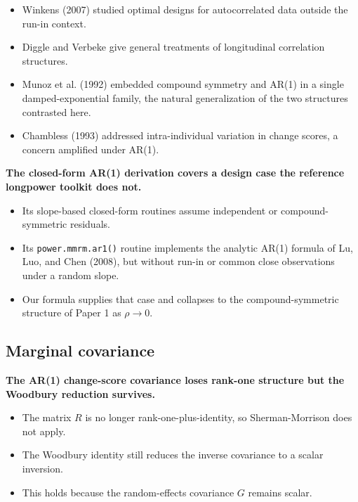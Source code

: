 \documentclass[
  11pt,
]{article}
\begin{document}
\begin{itemize}\setlength{\itemsep}{2pt}\setlength{\parskip}{0pt}
\item Winkens (2007) studied optimal designs for autocorrelated data outside the run-in context.
\item Diggle and Verbeke give general treatments of longitudinal correlation structures.
\item Munoz et al. (1992) embedded compound symmetry and AR(1) in a single damped-exponential family, the natural generalization of the two structures contrasted here.
\item Chambless (1993) addressed intra-individual variation in change scores, a concern amplified under AR(1).
\end{itemize}

\textbf{The closed-form AR(1) derivation covers a design case the reference longpower toolkit does not.}

\begin{itemize}\setlength{\itemsep}{2pt}\setlength{\parskip}{0pt}
\item Its slope-based closed-form routines assume independent or compound-symmetric residuals.
\item Its \texttt{power.mmrm.ar1()} routine implements the analytic AR(1) formula of Lu, Luo, and Chen (2008), but without run-in or common close observations under a random slope.
\item Our formula supplies that case and collapses to the compound-symmetric structure of Paper 1 as $\rho \to 0$.
\end{itemize}

\subsection{Marginal covariance}\label{marginal-covariance}

\textbf{The AR(1) change-score covariance loses rank-one structure but the Woodbury reduction survives.}

\begin{itemize}\setlength{\itemsep}{2pt}\setlength{\parskip}{0pt}
\item The matrix $R$ is no longer rank-one-plus-identity, so Sherman-Morrison does not apply.
\item The Woodbury identity still reduces the inverse covariance to a scalar inversion.
\item This holds because the random-effects covariance $G$ remains scalar.
\end{itemize}
\end{document}
